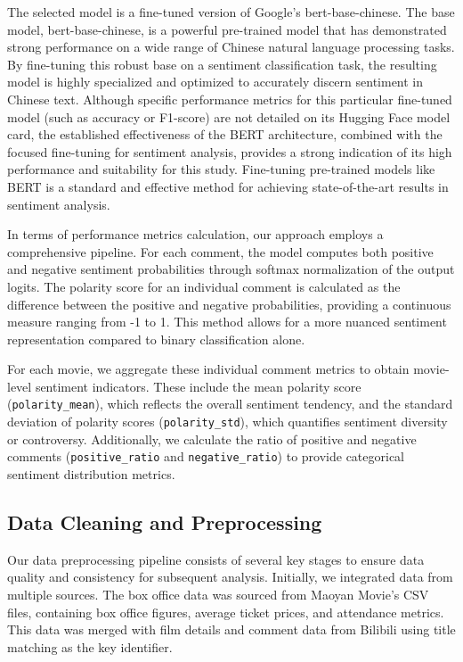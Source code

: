 \documentclass{article}
\begin{document}
The selected model \cite{left0ver_bert_sentiment} is a fine-tuned version of Google's bert-base-chinese. The base model, bert-base-chinese, is a powerful pre-trained model that has demonstrated strong performance on a wide range of Chinese natural language processing tasks. By fine-tuning this robust base on a sentiment classification task, the resulting model is highly specialized and optimized to accurately discern sentiment in Chinese text. Although specific performance metrics for this particular fine-tuned model (such as accuracy or F1-score) are not detailed on its Hugging Face model card, the established effectiveness of the BERT architecture, combined with the focused fine-tuning for sentiment analysis, provides a strong indication of its high performance and suitability for this study. Fine-tuning pre-trained models like BERT is a standard and effective method for achieving state-of-the-art results in sentiment analysis.

In terms of performance metrics calculation, our approach employs a comprehensive pipeline. For each comment, the model computes both positive and negative sentiment probabilities through softmax normalization of the output logits. The polarity score for an individual comment is calculated as the difference between the positive and negative probabilities, providing a continuous measure ranging from -1 to 1. This method allows for a more nuanced sentiment representation compared to binary classification alone.

For each movie, we aggregate these individual comment metrics to obtain movie-level sentiment indicators. These include the mean polarity score (\texttt{polarity\_mean}), which reflects the overall sentiment tendency, and the standard deviation of polarity scores (\texttt{polarity\_std}), which quantifies sentiment diversity or controversy. Additionally, we calculate the ratio of positive and negative comments (\texttt{positive\_ratio} and \texttt{negative\_ratio}) to provide categorical sentiment distribution metrics.



\subsection{Data Cleaning and Preprocessing}
Our data preprocessing pipeline consists of several key stages to ensure data quality and consistency for subsequent analysis. Initially, we integrated data from multiple sources. The box office data was sourced from Maoyan Movie's CSV files, containing box office figures, average ticket prices, and attendance metrics. This data was merged with film details and comment data from Bilibili using title matching as the key identifier.
\end{document}
